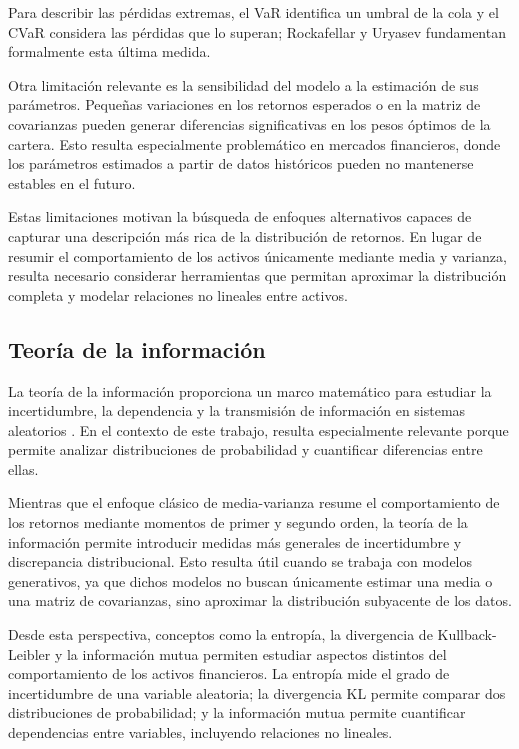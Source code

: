 Para describir las pérdidas extremas, el VaR identifica un umbral de la cola y el CVaR considera las pérdidas que lo superan; Rockafellar y Uryasev \citeyear{rockafellar2000optimization} fundamentan formalmente esta última medida.

Otra limitación relevante es la sensibilidad del modelo a la estimación de sus parámetros. Pequeñas variaciones en los retornos esperados o en la matriz de covarianzas pueden generar diferencias significativas en los pesos óptimos de la cartera. Esto resulta especialmente problemático en mercados financieros, donde los parámetros estimados a partir de datos históricos pueden no mantenerse estables en el futuro.

Estas limitaciones motivan la búsqueda de enfoques alternativos capaces de capturar una descripción más rica de la distribución de retornos. En lugar de resumir el comportamiento de los activos únicamente mediante media y varianza, resulta necesario considerar herramientas que permitan aproximar la distribución completa y modelar relaciones no lineales entre activos.

\subsection{Teoría de la información}

La teoría de la información proporciona un marco matemático para estudiar la incertidumbre, la dependencia y la transmisión de información en sistemas aleatorios \cite{cover2006elements}. En el contexto de este trabajo, resulta especialmente relevante porque permite analizar distribuciones de probabilidad y cuantificar diferencias entre ellas.

Mientras que el enfoque clásico de media-varianza resume el comportamiento de los retornos mediante momentos de primer y segundo orden, la teoría de la información permite introducir medidas más generales de incertidumbre y discrepancia distribucional. Esto resulta útil cuando se trabaja con modelos generativos, ya que dichos modelos no buscan únicamente estimar una media o una matriz de covarianzas, sino aproximar la distribución subyacente de los datos.

Desde esta perspectiva, conceptos como la entropía, la divergencia de Kullback-Leibler y la información mutua permiten estudiar aspectos distintos del comportamiento de los activos financieros. La entropía mide el grado de incertidumbre de una variable aleatoria; la divergencia KL permite comparar dos distribuciones de probabilidad; y la información mutua permite cuantificar dependencias entre variables, incluyendo relaciones no lineales.


